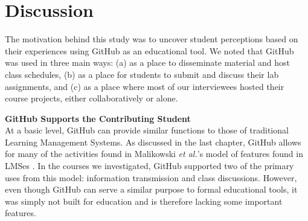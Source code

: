\section{Discussion}
The motivation behind this study was to uncover student perceptions based on their experiences using GitHub as an educational tool. We noted that GitHub was used in three main ways: (a) as a place to disseminate material and host class schedules, (b) as a place for students to submit and discuss their lab assignments, and (c) as a place where most of our interviewees hosted their course projects, either collaboratively or alone.




\textbf{GitHub Supports the Contributing Student} \\
At a basic level, GitHub can provide similar functions to those of traditional Learning Management Systems. As discussed in the last chapter, GitHub allows for many of the activities found in Malikowski \textit{et al.}'s model of features found in LMSes \cite{malikowski2007model}. In the courses we investigated, GitHub supported two of the primary uses from this model: information transmission and class discussions. However, even though GitHub can serve a similar purpose to formal educational tools, it was simply not built for education and is therefore lacking some important features.

